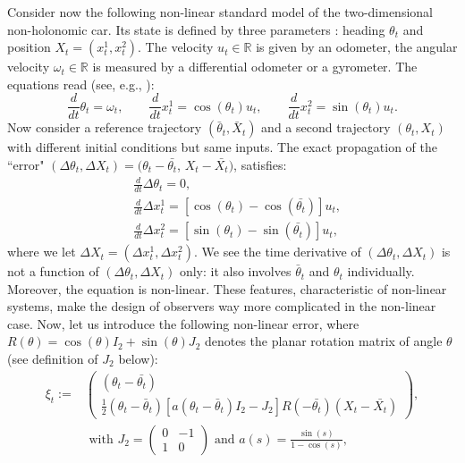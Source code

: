 \documentclass[a4paper,12pt,onecolumn]{article}
\newcommand{\RR}{{\mathbb{R}}}
\begin{document}
Consider now the following non-linear standard  model of the two-dimensional non-holonomic car. Its state is defined by three parameters : heading $\theta_t$ and position $X_t=(x_t^1,x_t^2)$. The velocity $u_t\in\RR$ is given by an odometer, the angular velocity $\omega_t\in\RR$ is measured by a differential odometer or a gyrometer. The equations read (see, e.g., \cite{de1998feedback}):
$$
 \frac{d}{dt} \theta_t  = \omega_t , \qquad \frac{d}{dt} x_t^1  = \cos(\theta_t) u_t , \qquad 
 \frac{d}{dt} x_t^2  = \sin(\theta_t) u_t. 
$$
Now consider a reference trajectory $(\bar{\theta}_t,\bar{X}_t)$ and a second trajectory $(\theta_t,X_t)$ with different initial conditions but same inputs. The exact propagation of the ``error" $(\Delta \theta_t, \Delta X_t)=(\theta_t - \bar{\theta_t}$, $ X_t-\bar{X_t})$,  satisfies:
\begin{equation}\begin{aligned}\label{ouaich}
 &\frac{d}{dt} \Delta \theta_t  = 0 , \\
& \frac{d}{dt} \Delta x_t^1  = \left[ \cos( \theta_t) - \cos(\bar{\theta_t})  \right] u_t ,\\&
 \frac{d}{dt} \Delta x_t^2  = \left[ \sin(\theta_t) - \sin(\bar{\theta_t})  \right] u_t ,
\end{aligned}\end{equation}
where we let $\Delta X_t=(\Delta x_t^1 ,\Delta x_t^2)$. We see the time derivative of  $(\Delta \theta_t, \Delta X_t)$ is not a function of $(\Delta \theta_t, \Delta X_t)$ only: it also involves $\bar \theta_t$ and $\theta_t$ individually. Moreover, the equation is non-linear. These features, characteristic of non-linear systems, make the design of observers way more complicated in the non-linear case. Now, let us introduce the following non-linear error, where $R(\theta) = \cos(\theta)I_2 + \sin(\theta)J_2 $ denotes the planar rotation matrix of angle $\theta$  (see definition of $J_2$ below):
\begin{equation}\begin{aligned}\label{xi:ccar}
\xi_t:= & \begin{pmatrix} (\theta_t - \bar{\theta_t}) \\ \frac{1}{2} \left( \theta_t - \bar \theta_t \right) \left[ a(\theta_t - \bar \theta_t ) I_2 - J_2 \right] R(-\bar{\theta_t})(X_t-\bar{X_t}) \end{pmatrix}, \\ & \text{ with  } J_2=\begin{pmatrix} 0 & -1 \\ 1 & 0 \end{pmatrix} \text{ and } a(s) = \frac{\sin(s)}{1-\cos(s)},
\end{aligned}\end{equation}
\end{document}
